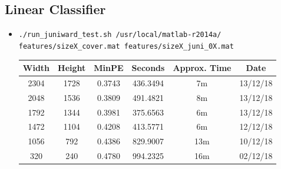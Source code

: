 \documentclass[11pt,a4paper]{report}
\begin{document}
\subsection{Linear Classifier} \label{j01-classifier}
\begin{itemize}
\item \texttt{./run\_juniward\_test.sh /usr/local/matlab-r2014a/} \\
         \texttt{features/sizeX\_cover.mat features/sizeX\_juni\_0X.mat}
  \begin{center}
  \begin{tabular}{ c c | c | c c c }
  Width & Height & MinPE & Seconds & Approx. Time & Date \\ \hline
  2304 & 1728 & 0.3743 & 436.3494 & 7m & 13/12/18 \\
  2048 & 1536 & 0.3809 & 491.4821 & 8m & 13/12/18 \\
  1792 & 1344 & 0.3981 & 375.6563 & 6m & 13/12/18 \\
  1472 & 1104 & 0.4208 & 413.5771 & 6m & 12/12/18 \\
  1056 & 792 & 0.4386 & 829.9007 & 13m & 10/12/18 \\
  320 & 240 & 0.4780 & 994.2325 & 16m & 02/12/18 \\
  \end{tabular}
  \end{center}
\end{itemize}
\end{document}
